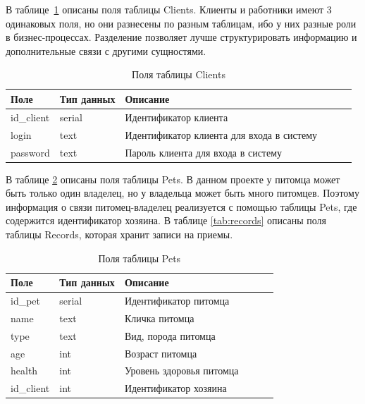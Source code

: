 В таблице~\ref{tab:clients} описаны поля таблицы Clients. Клиенты и работники имеют 3 одинаковых поля, но они разнесены по разным таблицам, ибо у них разные роли в бизнес-процессах. Разделение позволяет лучше структурировать информацию и дополнительные связи с другими сущностями.
\begin{table}[hbtp]
	\begin{center}
		\caption{\label{tab:clients}Поля таблицы Clients}
		\begin{tabular}{|l|l|l|l|l|l|}
			\hline {Поле} & {Тип данных} & {Описание}  \\ \hline
		id\_client  & serial & Идентификатор клиента   \\ \hline
		login & text & Идентификатор клиента для входа в систему \\ \hline
		password & text & Пароль клиента для входа в систему  \\ \hline
		\end{tabular}
	\end{center}
\end{table}

 В таблице \ref{tab:pets}  описаны поля таблицы Pets. В данном проекте у питомца может быть только один владелец, но у владельца может быть много питомцев. Поэтому информация о связи питомец-владелец реализуется с помощью таблицы Pets, где содержится идентификатор хозяина. В таблице \ref{tab:records}  описаны поля таблицы Records, которая хранит записи на приемы. 
 
\begin{table}[hbtp]
	\begin{center}
			\captionsetup{justification=raggedright, singlelinecheck=false}
			\caption{\label{tab:pets}Поля таблицы Pets}
		\begin{tabular}{|l|l|l|l|l|l|}
			\hline {Поле} & {Тип данных} & {Описание}  \\ \hline
			id\_pet  & serial & Идентификатор питомца   \\ \hline
			name & text & Кличка питомца \\ \hline
			type & text & Вид, порода питомца  \\ \hline
			age & int & Возраст питомца \\ \hline
			health & int & Уровень здоровья питомца  \\ \hline
			id\_client & int & Идентификатор хозяина  \\ \hline
		\end{tabular}
	\end{center}
\end{table}

